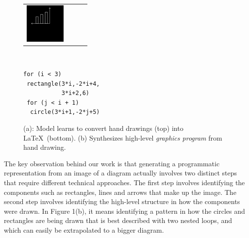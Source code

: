 \documentclass{article}
\newcommand{\exampleImageSize}{2cm}
\begin{document}
\begin{figure}[H]
\begin{minipage}[t]{0.7\linewidth}
\begin{tabular}{llll}
    \includegraphics[width = \exampleImageSize]{figures/58.png}
\end{tabular}
\subcaption{}
  \end{minipage}%
  \begin{minipage}[t]{0.3\linewidth}
    \\
    \begin{minipage}[t]{0.3\linewidth}
\begin{Verbatim}
for (i < 3)
 rectangle(3*i,-2*i+4,
           3*i+2,6)
 for (j < i + 1)
  circle(3*i+1,-2*j+5)
\end{Verbatim}      
      \end{minipage}
    \subcaption{}
  \end{minipage}
  \caption{(a): Model learns to convert hand drawings (top) into \LaTeX~(bottom). (b) Synthesizes high-level \emph{graphics program} from hand drawing.}\label{firstPageExamples}
\end{figure}
 
The key observation behind our work is that generating a programmatic representation from an image of a diagram actually involves two distinct steps that require different technical approaches. The first step involves identifying the components such as rectangles, lines and arrows that make up the image. The second step involves identifying the high-level structure in how the components were drawn. In Figure 1(b), it means identifying a pattern in how the circles and rectangles are being drawn that is best described with two nested loops, and which can easily be extrapolated to a bigger diagram. 
\end{document}

